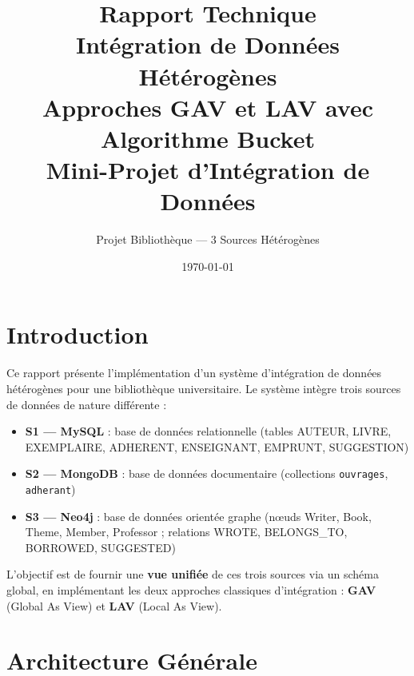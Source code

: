 \documentclass[12pt,a4paper]{article}
\title{
  \textbf{Rapport Technique}\\[0.5cm]
  \Large Intégration de Données Hétérogènes\\
  Approches GAV et LAV avec Algorithme Bucket\\[0.3cm]
  \large Mini-Projet d'Intégration de Données
}
\author{Projet Bibliothèque — 3 Sources Hétérogènes}
\date{\today}
\begin{document}
\maketitle
\tableofcontents
\newpage

\section{Introduction}

Ce rapport présente l'implémentation d'un système d'intégration de données hétérogènes pour une bibliothèque universitaire. Le système intègre trois sources de données de nature différente :

\begin{itemize}
  \item \textbf{S1 — MySQL} : base de données relationnelle (tables AUTEUR, LIVRE, EXEMPLAIRE, ADHERENT, ENSEIGNANT, EMPRUNT, SUGGESTION)
  \item \textbf{S2 — MongoDB} : base de données documentaire (collections \texttt{ouvrages}, \texttt{adherant})
  \item \textbf{S3 — Neo4j} : base de données orientée graphe (nœuds Writer, Book, Theme, Member, Professor ; relations WROTE, BELONGS\_TO, BORROWED, SUGGESTED)
\end{itemize}

L'objectif est de fournir une \textbf{vue unifiée} de ces trois sources via un schéma global, en implémentant les deux approches classiques d'intégration : \textbf{GAV} (Global As View) et \textbf{LAV} (Local As View).

\section{Architecture Générale}
\end{document}
